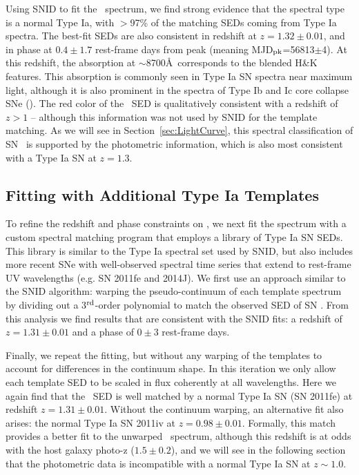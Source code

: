 Using SNID to fit the \tomas\ spectrum, we find strong evidence that
the spectral type is a normal Type Ia, with $>$97\% of the matching
SEDs coming from Type Ia spectra.  The best-fit SEDs are also
consistent in redshift at $z=1.32\pm0.01$, and in phase at $0.4\pm1.7$
rest-frame days from peak (meaning MJD$_{\rm pk}$=56813$\pm$4).  At
this redshift, the absorption at $\sim$8700\AA\ corresponds to the
blended  H\&K features.  This  absorption is
commonly seen in Type Ia SN spectra near maximum light, although it is
also prominent in the spectra of Type Ib and Ic core collapse SNe
(\CCSNe).  The red color of the \tomas\ SED is qualitatively
consistent with a redshift of $z>1$ -- although this information was
not used by SNID for the template matching.  As we will see in
Section~\ref{sec:LightCurve}, this spectral classification of
SN \tomas\ is supported by the photometric information, which is also
most consistent with a Type Ia SN at $z=1.3$.


\subsection{Fitting with Additional Type Ia Templates}
\label{sec:FittingWithAdditionalTypeIaTemplates}

To refine the redshift and phase constraints on \tomas, we next fit
the spectrum with a custom spectral matching program that employs a
library of Type Ia SN SEDs.  This library is similar to the Type Ia
spectral set used by SNID, but also includes more recent SNe with
well-observed spectral time series that extend to rest-frame UV
wavelengths (e.g. SN 2011fe and 2014J).  We first use an approach
similar to the SNID algorithm: warping the pseudo-continuum of each
template spectrum by dividing out a 3$^{\rm rd}$-order polynomial to match the
observed SED of SN \tomas.  From this analysis we find results that
are consistent with the SNID fits: a redshift of $z=1.31\pm0.01$ and a
phase of $0\pm3$ rest-frame days.   

Finally, we repeat the fitting, but without any warping of the
templates to account for differences in the continuum shape.  In this
iteration we only allow each template SED to be scaled in flux
coherently at all wavelengths.  Here we again find that the \tomas\
SED is well matched by a normal Type Ia SN (SN 2011fe) at redshift
$z=1.31\pm0.01$.  Without the continuum warping, an alternative fit
also arises: the normal Type Ia SN 2011iv at
$z=0.98\pm0.01$. Formally, this match provides a better fit to the
unwarped \tomas\ spectrum, although this redshift is at odds with the
host galaxy photo-z ($1.5\pm0.2$), and we will see in the following
section that the photometric data is incompatible with a normal Type
Ia SN at $z\sim1.0$.


